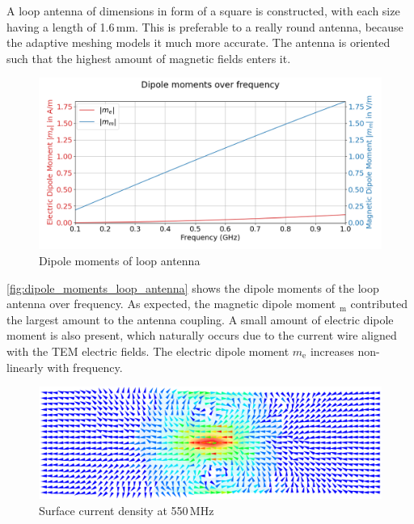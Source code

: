 A loop antenna of dimensions in form of a square is constructed, with each size having a length of 1.6\,mm. This is preferable to a really round antenna, because the adaptive meshing models it much more accurate.  The antenna is oriented such that the highest amount of magnetic fields enters it.

\begin{figure}[h]
    \centering
    \includegraphics[width=1\linewidth]{content//30_simulations//img/dipole_moments_loop_antenna.png}
    \caption{Dipole moments of loop antenna}
    \label{fig:dipole_moments_loop_antenna}
\end{figure}

\autoref{fig:dipole_moments_loop_antenna} shows the dipole moments of the loop antenna over frequency. As expected, the magnetic dipole moment $_\mathrm{m}$ contributed the largest amount to the antenna coupling. A small amount of electric dipole moment is also present, which naturally occurs due to the current wire aligned with the TEM electric fields. The electric dipole moment $m_\mathrm{e}$ increases non-linearly with frequency. 

\begin{figure}[h]
    \centering
    \includegraphics[width=1\linewidth]{content//30_simulations//img/current_loop_surface_current.png}
    \caption{Surface current density at 550\,MHz}
    \label{fig:current_loop_surface_current}
\end{figure}




